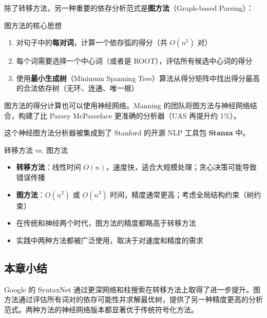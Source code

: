 \documentclass[a4paper]{article}
\begin{document}
除了转移方法，另一种重要的依存分析范式是\textbf{图方法}（Graph-based Parsing）：

\begin{importantbox}{图方法的核心思想}
\begin{enumerate}
    \item 对句子中的\textbf{每对词}，计算一个依存弧的得分（共 $O(n^2)$ 对）
    \item 每个词需要选择一个中心词（或者是 ROOT），评估所有候选中心词的得分
    \item 使用\textbf{最小生成树}（Minimum Spanning Tree）算法从得分矩阵中找出得分最高的合法依存树（无环、连通、唯一根）
\end{enumerate}
\end{importantbox}





图方法的得分计算也可以使用神经网络。Manning 的团队将图方法与神经网络结合，构建了比 Parsey McParseface 更准确的分析器（UAS 再提升约 1\%）。





这个神经图方法分析器被集成到了 Stanford 的开源 NLP 工具包 \textbf{Stanza} 中。

\begin{knowledgebox}{转移方法 vs. 图方法}
\begin{itemize}
    \item \textbf{转移方法}：线性时间 $O(n)$，速度快，适合大规模处理；贪心决策可能导致错误传播
    \item \textbf{图方法}：$O(n^2)$ 或 $O(n^3)$ 时间，精度通常更高；考虑全局结构约束（树约束）
    \item 在传统和神经两个时代，图方法的精度都略高于转移方法
    \item 实践中两种方法都被广泛使用，取决于对速度和精度的需求
\end{itemize}
\end{knowledgebox}

\subsection{本章小结}

Google 的 SyntaxNet 通过更深网络和柱搜索在转移方法上取得了进一步提升。图方法通过评估所有词对的依存可能性并求解最优树，提供了另一种精度更高的分析范式。两种方法的神经网络版本都显著优于传统符号化方法。

\end{document}

